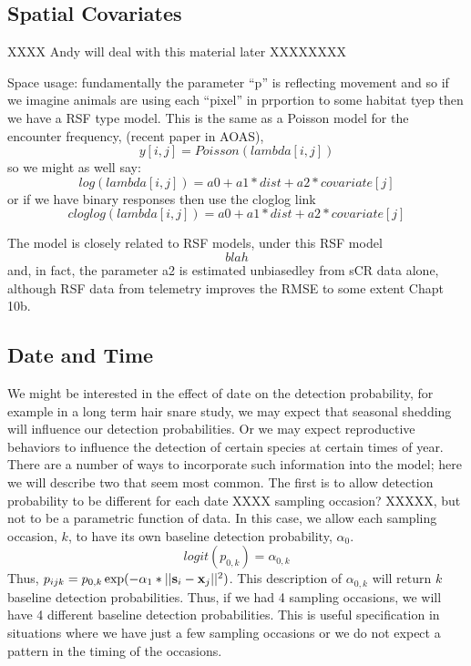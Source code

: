 \subsection{Spatial Covariates}

XXXX Andy will deal with this material later XXXXXXXX

Space usage: fundamentally the parameter ``p'' is reflecting movement
and so if we imagine animals are using each ``pixel'' in prportion to
some habitat tyep then we have a RSF type model. This is the same
as a Poisson model for the encounter frequency, (recent paper in AOAS),
\[
 y[i,j] = Poisson(lambda[i,j])
\]
so we might as well say:
\[
log(lambda[i,j]) = a0 + a1*dist + a2*covariate[j]
\]
or if we have binary responses then use the cloglog link
\[
 cloglog(lambda[i,j]) = a0 + a1*dist + a2*covariate[j]
\]

The model is closely related to RSF models, under this RSF model
\[
blah 
\]
 and, in fact, the parameter
a2 is estimated unbiasedley from sCR data alone, although RSF data
from telemetry improves the RMSE to some extent Chapt 10b. 





\subsection{Date and Time}

We might be interested in the effect of date on the detection
probability, for example in a long term hair snare study, we may
expect that seasonal shedding will influence our detection
probabilities.  Or we may expect reproductive behaviors to influence
the detection of certain species at certain times of year.  There are
a number of ways to incorporate such information into the model; here
we will describe two that seem most common.  The first is to allow
detection probability to be different for each date XXXX sampling
occasion? XXXXX, but not to be a
parametric function of data.  In this case, we allow each sampling
occasion, $k$, to have its own baseline detection probability,
$\alpha_0$.
\[
logit(p_{0,k}) = \alpha_{0,k}
\]
Thus, $p_{ijk} = p_{0,k} \exp(- \alpha_1*||{\bf s}_{i}-{\bf x}_{j}||^2)$. This
description of $\alpha_{0,k}$ will return $k$ baseline detection
probabilities.  Thus, if we had 4 sampling occasions, we will have 4
different baseline detection probabilities.  This is useful
specification in situations where we have just a few sampling
occasions or we do not expect a pattern in the timing of the
occasions.

